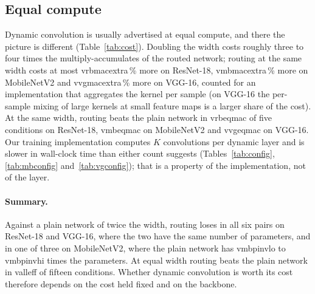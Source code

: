 \documentclass[10pt,a4paper]{article}
\newcommand{\V}[1]{\csname v#1\endcsname}
\begin{document}
\subsection{Equal compute}

Dynamic convolution is usually advertised at equal compute, and there the
picture is different (Table~\ref{tab:cost}). Doubling the width costs
roughly three to four times the multiply-accumulates of the routed network;
routing at the same width costs at most \V{rbmacextra}\,\% more on
ResNet-18, \V{mbmacextra}\,\% more on MobileNetV2 and \V{vgmacextra}\,\%
more on VGG-16, counted for an implementation that aggregates the kernel
per sample (on VGG-16 the per-sample mixing of large kernels at small
feature maps is a larger share of the cost). At the same width, routing
beats the plain network in \V{rbeqmac} of five conditions on ResNet-18,
\V{mbeqmac} on MobileNetV2 and \V{vgeqmac} on VGG-16. Our training
implementation computes $K$ convolutions per dynamic layer and is slower in
wall-clock time than either count suggests (Tables~\ref{tab:config},
\ref{tab:mbconfig} and~\ref{tab:vgconfig}); that is a property of the
implementation, not of the layer.

\paragraph{Summary.} Against a plain network of twice the width, routing
loses in all six pairs on ResNet-18 and VGG-16, where the two have the same
number of parameters, and in one of three on MobileNetV2, where the plain
network has \V{mbpinvlo} to \V{mbpinvhi} times the parameters. At equal
width routing beats the plain network in \V{alleff} of fifteen conditions.
Whether dynamic convolution is worth its cost therefore depends on the
cost held fixed and on the backbone.
\end{document}
